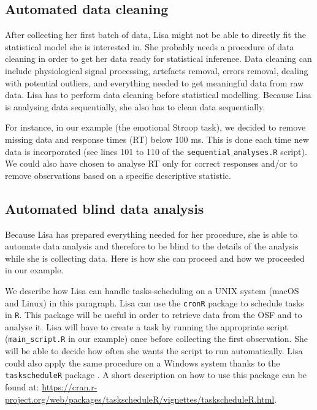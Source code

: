 \documentclass[a4paper,jou,natbib,floatsintext,donotrepeattitle]{apa6}
\begin{document}
\subsection{Automated data cleaning}

After collecting her first batch of data, Lisa might not be able to directly fit the statistical model she is interested in. She probably needs a procedure of data cleaning in order to get her data ready for statistical inference. Data cleaning can include physiological signal processing, artefacts removal, errors removal, dealing with potential outliers, and everything needed to get meaningful data from raw data. Lisa has to perform data cleaning before statistical modelling. Because Lisa is analysing data sequentially, she also has to clean data sequentially.

For instance, in our example (the emotional Stroop task), we decided to remove missing data and response times (RT) below 100 ms. This is done each time new data is incorporated (see lines 101 to 110 of the \texttt{sequential$\_$analyses.R} script). We could also have chosen to analyse RT only for correct responses and/or to remove observations based on a specific descriptive statistic.

\subsection{Automated blind data analysis}

Because Lisa has prepared everything needed for her procedure, she is able to automate data analysis and therefore to be blind to the details of the analysis while she is collecting data. Here is how she can proceed and how we proceeded in our example.

We describe how Lisa can handle tasks-scheduling on a UNIX system (macOS and Linux) in this paragraph. Lisa can use the \texttt{cronR} package \citep{Wijffels_cronR_2018} to schedule tasks in \texttt{R}. This package will be useful in order to retrieve data from the OSF and to analyse it. Lisa will have to create a task by running the appropriate script (\texttt{main\_script.R} in our example) once before collecting the first observation. She will be able to decide how often she wants the script to run automatically. Lisa could also apply the same procedure on a Windows system thanks to the \texttt{taskscheduleR} package \citep{Wijffels_taskscheduleR_2018}. A short description on how to use this package can be found at: \url{https://cran.r-project.org/web/packages/taskscheduleR/vignettes/taskscheduleR.html}.
\end{document}
